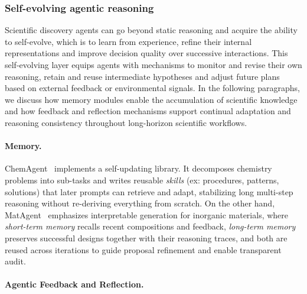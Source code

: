 \subsubsection{Self-evolving agentic reasoning}
\label{sec:app-science-evolving}

Scientific discovery agents can go beyond static reasoning and acquire the ability to self-evolve, which is to learn from experience, refine their internal representations and improve decision quality over successive interactions. This self-evolving layer equips agents with mechanisms to monitor and revise their own reasoning, retain and reuse intermediate hypotheses and adjust future plans based on external feedback or environmental signals. In the following paragraphs, we discuss how memory modules enable the accumulation  of scientific knowledge and how feedback and reflection mechanisms support continual adaptation and reasoning consistency throughout long-horizon scientific workflows.


\paragraph{Memory.}
\label{sec:app-science-memory}

ChemAgent~\cite{tang2025chemagentselfupdatinglibrarylarge} implements a self-updating library. It decomposes chemistry problems into sub-tasks and writes reusable \textit{skills} (ex: procedures, patterns, solutions) that later prompts can retrieve and adapt, stabilizing long multi-step reasoning without re-deriving everything from scratch. On the other hand, MatAgent~\cite{takahara2025acceleratedinorganicmaterialsdesign} emphasizes interpretable generation for inorganic materials, where \textit{short-term memory} recalls recent compositions and feedback, \textit{long-term memory} preserves successful designs together with their reasoning traces, and both are reused across iterations to guide proposal refinement and enable transparent audit.

\paragraph{Agentic Feedback and Reflection.}
\label{sec:app-science-feedback-reflect}


